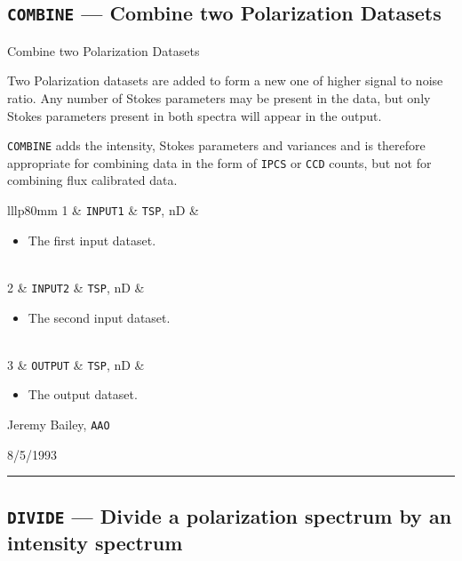 \documentclass[11pt,twoside]{article}
\makeatletter
\renewcommand{\_}{\texttt{\symbol{95}}}
\newcommand{\manrule}{\rule{\textwidth}{0.5mm}}
\newcommand{\manroutine}[3]{\subsection{#1 --- #2}}
\newenvironment{manroutinedescription}{\begin{description}}{\end{description}%
\manrule}
\newcommand{\manroutineitem}[2]{\item[#1:] #2\mbox{}}
\newcommand{\manparametercols}{lllp{80mm}}
\newcommand{\manparameterorder}[3]{#1 & #2 & #3 & }
\newcommand{\manparametertop}{}
\newcommand{\manparameterbottom}{}
\newenvironment{manparametertable}{\gdef\manparameter@ss{}%
\gdef\manparameter@hl{}\hspace*{\fill}\vspace*{-\partopsep}\begin{trivlist}%
\item[]\begin{tabular}{\manparametercols}\manparametertop}{\manparameterbottom%
\end{tabular}\end{trivlist}}
\newcommand{\manparameterentry}[3]{\manparameter@ss\gdef\manparameter@ss{\\}%
\gdef\manparameter@hl{\hline}\manparameterorder{#1}{#2}{#3}}
\newenvironment{manitemize}{\begin{itemize}}{\end{itemize}}
\newcommand{\manitemizeitem}{\item\mbox{}}
\newcommand{\mantt}{\tt}
\makeatother
\begin{document}
\manroutine{{\mantt{COMBINE}}}{Combine two Polarization Datasets}{COMBINE}
\begin{manroutinedescription}
\manroutineitem{Function}{}
        Combine two Polarization Datasets

\manroutineitem{Description}{}
        Two Polarization datasets are added to form a new one of
        higher signal to noise ratio. Any number of Stokes parameters
        may be present in the data, but only Stokes parameters present
        in both spectra will appear in the output.

        {\mantt{COMBINE}} adds the intensity, Stokes parameters and variances
        and is therefore appropriate for combining data in the form
        of {\mantt{IPCS}} or {\mantt{CCD}} counts, but not for combining flux %
calibrated
        data.

\manroutineitem{Parameters}{}
\begin{manparametertable}
\manparameterentry{1}{{\mantt{INPUT1}}}{{\mantt{TSP}}, nD}\begin{manitemize}
\manitemizeitem The first input dataset.
\end{manitemize}
\manparameterentry{2}{{\mantt{INPUT2}}}{{\mantt{TSP}}, nD}\begin{manitemize}
\manitemizeitem The second input dataset.
\end{manitemize}
\manparameterentry{3}{{\mantt{OUTPUT}}}{{\mantt{TSP}}, nD}\begin{manitemize}
\manitemizeitem The output dataset.
\end{manitemize}

\end{manparametertable}
\manroutineitem{Support}{Jeremy Bailey, {\mantt{AAO}}}
\manroutineitem{Version date}{8/5/1993}
\end{manroutinedescription}
\manroutine{{\mantt{DIVIDE}}}{Divide a polarization spectrum by an intensity %
spectrum}{DIVIDE}
\end{document}
